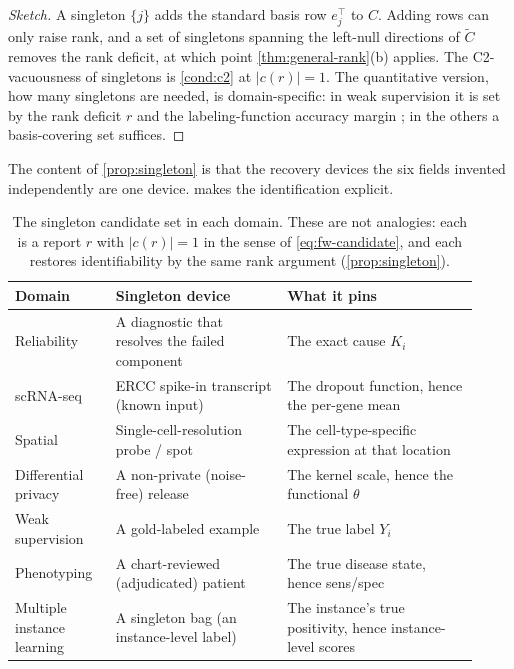 \begin{proof}[Sketch]
A singleton $\{j\}$ adds the standard basis row $e_j^\top$ to $C$.
Adding rows can only raise rank, and a set of singletons spanning the
left-null directions of $\tilde C$ removes the rank deficit, at which
point \cref{thm:general-rank}(b) applies. The C2-vacuousness of
singletons is \cref{cond:c2} at $|c(r)| = 1$. The quantitative version,
how many singletons are needed, is domain-specific: in weak
supervision it is set by the rank deficit $r$ and the labeling-function
accuracy margin \citep{towell2026weaksupcoarsening}; in the others a
basis-covering set suffices.
\end{proof}

The content of \cref{prop:singleton} is that the recovery devices the
six fields invented independently are one device. 
makes the identification explicit.

\begin{table}[tb]
\centering
\small
\begin{tabular}{@{}p{0.20\linewidth} p{0.34\linewidth} p{0.38\linewidth}@{}}
\toprule
\textbf{Domain} & \textbf{Singleton device} & \textbf{What it pins} \\
\midrule
Reliability \citep{towell2026masked} &
  A diagnostic that resolves the failed component &
  The exact cause $K_i$ \\
scRNA-seq \citep{towell2026scrnacoarsening} &
  ERCC spike-in transcript (known input) &
  The dropout function, hence the per-gene mean \\
Spatial \citep{towell2026spatialcoarsening} &
  Single-cell-resolution probe / spot &
  The cell-type-specific expression at that location \\
Differential privacy \citep{towell2026dpcoarsening} &
  A non-private (noise-free) release &
  The kernel scale, hence the functional $\theta$ \\
Weak supervision \citep{towell2026weaksupcoarsening} &
  A gold-labeled example &
  The true label $Y_i$ \\
Phenotyping \citep{towell2026phenotypecoarsening} &
  A chart-reviewed (adjudicated) patient &
  The true disease state, hence sens/spec \\
Multiple instance learning \citep{towell2026milcoarsening} &
  A singleton bag (an instance-level label) &
  The instance's true positivity, hence instance-level scores \\
\bottomrule
\end{tabular}
\caption{The singleton candidate set in each domain. These are not
analogies: each is a report $r$ with $|c(r)| = 1$ in the sense of
\eqref{eq:fw-candidate}, and each restores identifiability by the same
rank argument (\cref{prop:singleton}).}
\label{tab:singletons}
\end{table}

